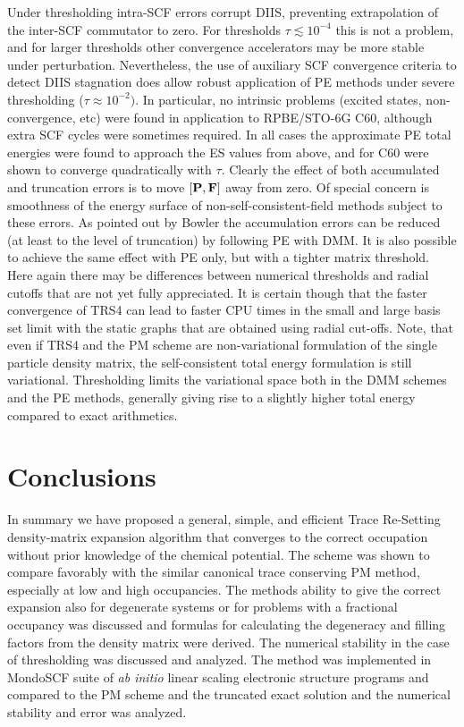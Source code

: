 \commentoutA{\documentclass[prb,aps,twocolumn,twocolumngrid,secnumarabic]{revtex4}}
\begin{document}
Under thresholding intra-SCF errors corrupt DIIS, preventing 
extrapolation of the inter-SCF commutator to zero.  For thresholds $\tau \lesssim 10^{-4}$
this is not a problem, and for larger thresholds other convergence 
accelerators may be more stable under perturbation.  Nevertheless,
the use of auxiliary SCF convergence criteria 
to detect DIIS stagnation does allow robust application of PE methods
under severe thresholding ($\tau \approx 10^{-2})$.
In particular, no intrinsic problems (excited states, non-convergence, etc) were
found in application to RPBE/STO-6G C60, although extra SCF cycles were sometimes required. 
In all cases the approximate PE total energies were found to approach the ES values
from above, and for C60 were shown to converge quadratically with $\tau$.
Clearly the effect of both accumulated and truncation errors is to move 
$[\bf P,F]$ away from zero.  Of special concern is smoothness
of the energy surface of non-self-consistent-field methods subject to these errors.  
As pointed out by Bowler \cite{DBowler99} the accumulation errors can be reduced 
(at least to the level of truncation) by following PE with DMM. 
It is also possible to achieve the same effect with PE only, but with a tighter matrix threshold.  
Here again there may be differences between numerical thresholds and radial cutoffs 
that are not yet fully appreciated. It is certain though that the faster convergence of TRS4 can 
lead to faster CPU times in the small and large basis set limit with the static graphs 
that are obtained using radial cut-offs. Note, that even if TRS4 and the PM scheme are 
non-variational formulation of the single particle density matrix, the self-consistent
total energy formulation is still variational. Thresholding limits the variational space
both in the  DMM schemes and the PE methods, generally giving rise to a slightly
higher total energy compared to exact arithmetics.

\section{Conclusions}

In summary we have proposed a general, simple, and efficient 
Trace Re-Setting density-matrix expansion algorithm that converges 
to the correct occupation without prior knowledge of the chemical
potential. The scheme was shown to compare favorably with the
similar canonical trace conserving PM method, especially at
low and high occupancies. The methods ability to give the
correct expansion also for degenerate systems or for problems
with a fractional occupancy was discussed
and formulas for calculating the degeneracy and filling factors
from the density matrix were derived. 
The numerical stability in the case of thresholding
was discussed and analyzed. The method was implemented in
{\sc MondoSCF} suite of {\it ab initio} linear scaling electronic structure
programs and compared to the PM scheme and the
truncated exact solution and the numerical stability
and error was analyzed.
\end{document}
